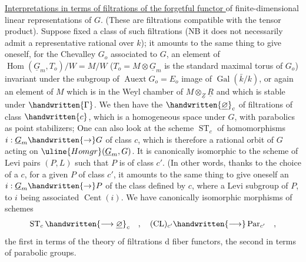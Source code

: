 \uline{Interpretations in terms of filtrations of the forgetful functor } of finite-dimensional linear representations of $G$. (These are filtrations compatible with the tensor product). Suppose fixed a class of such filtrations (NB it does not necessarily admit a representative rational over $k$); it amounts to the same thing to give oneself, for the Chevalley $G_o$ associated to $G$, an  element of $\operatorname{Hom}(\underline{G}_m,T_o)/W=M/W$ ($T_o=M\otimes\underline{G}_m$ is the standard maximal torus of $G_o$) invariant under the subgroup\inserted{\handwritten{$\Gamma$}} of $\operatorname{Auext}G_o=E_o$ image of $\operatorname{Gal}(\bar{k}/k)$, or again an  element of $M$ which is in the Weyl chamber of $M\otimes_{\underline{Z}}\underline{R}$ and which is stable under $\handwritten{\Gamma}$. We then have the  $\handwritten{\underline{\varnothing}}_c$ of filtrations of class $\handwritten{c}$, which is a homogeneous space under $G$, with parabolics as point stabilizers; One can also look at the scheme $\operatorname{ST}_c$ of homomorphisms $i:\underline{G}_m\handwritten{\to}G$ of class $c$, which is therefore a rational orbit of $G$ acting on $\uline{Homgr}(\underline{G}_m,G)$. It is canonically isomorphic to the scheme of Levi pairs $(P,L)$ such that $P$ is of class $c'$. (In other words, thanks to the choice of a $c$, for a given $P$ of class $c'$, it amounts to the same thing to give oneself an $i:\underline{G}_m\handwritten{\to}P$ of the class defined by $c$, where a Levi subgroup of $P$, to $i$ being associated $\operatorname{Cent}(i)$.\handwritten{)} We have canonically isomorphic morphisms of schemes
\[
\operatorname{ST}_c\handwritten{\longrightarrow\underline{\varnothing}}_c\quad,\quad
(\operatorname{CL})_{c'}\handwritten{\longrightarrow}\operatorname{Par}_{c'}\quad,
\]
the first in terms of the theory of filtrations d fiber functors, the second in terms of parabolic groups.

